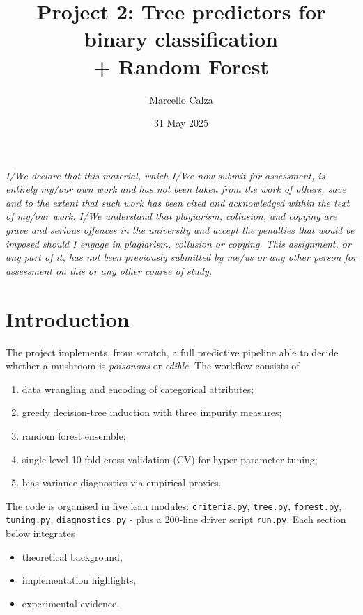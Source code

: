 \documentclass[12pt]{report}
\title{\bfseries%
Project 2: Tree predictors for binary classification\\[4pt]
\large + Random Forest}
\author{Marcello Calza}
\date{31 May 2025}
\begin{document}
\maketitle
\tableofcontents
\clearpage

\emph{I/We declare that this material, which I/We now submit for assessment, is entirely my/our 
own work and has not been taken from the work of others, save and to the extent that such 
work has been cited and acknowledged within the text of my/our work. I/We understand that 
plagiarism, collusion, and copying are grave and serious offences in the university and 
accept the penalties that would be imposed should I engage in plagiarism, collusion or 
copying. This assignment, or any part of it, has not been previously submitted by me/us 
or any other person for assessment on this or any other course of study.}

\section{Introduction}

The project implements, from scratch, a full predictive pipeline able to decide whether
a mushroom is \textit{poisonous} or \textit{edible}. The workflow consists of

\begin{enumerate}
  \item data wrangling and encoding of categorical attributes;
  \item greedy decision-tree induction with three impurity measures;
  \item random forest ensemble;
  \item single-level 10-fold cross-validation (CV) for hyper-parameter tuning;
  \item bias-variance diagnostics via empirical proxies.
\end{enumerate}

The code is organised in five lean modules: \texttt{criteria.py}, \texttt{tree.py},
\texttt{forest.py}, \texttt{tuning.py}, \texttt{diagnostics.py} - plus a 200-line driver
script \texttt{run.py}.  Each section below integrates

\begin{itemize}
  \item theoretical background,
  \item implementation highlights,
  \item experimental evidence.
\end{itemize}
\end{document}
